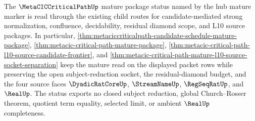The $\MetaCICCriticalPathUp$ mature package status named by the hub mature marker is read through the existing child routes for candidate-mediated strong normalization, confluence, decidability, residual diamond scope, and L10 source packages. In particular, \autoref{thm:metaciccriticalpath-candidate-schedule-mature-package}, \autoref{thm:metacic-critical-path-mature-package}, \autoref{thm:metacic-critical-path-l10-source-candidate-frontier}, and \autoref{thm:metacic-critical-path-mature-l10-source-socket-separation} keep the mature read on the displayed packet rows while preserving the open subject-reduction socket, the residual-diamond budget, and the four source faces $\DyadicRatCoreUp$, $\StreamNameUp$, $\RegSeqRatUp$, and $\RealUp$. The status exports no closed subject reduction, global Church--Rosser theorem, quotient term equality, selected limit, or ambient $\RealUp$ completeness.
